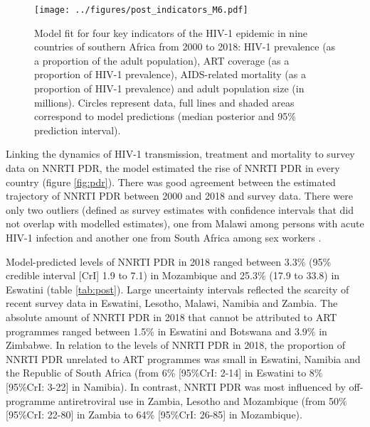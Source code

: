 \documentclass{article}
\begin{document}
\begin{sidewaysfigure}
	\centering
	\texttt{[image: ../figures/post\_indicators\_M6.pdf]}
	\caption{Model fit for four key indicators of the HIV-1 epidemic in nine countries of southern Africa from 2000 to 2018: HIV-1 prevalence (as a proportion of the adult population), ART coverage (as a proportion of HIV-1 prevalence), AIDS-related mortality (as a proportion of HIV-1 prevalence) and adult population size (in millions).  Circles represent data, full lines and shaded areas correspond to model predictions (median posterior and 95\% prediction interval).}
	\label{fig:indic}
\end{sidewaysfigure}

Linking the dynamics of HIV-1 transmission, treatment and mortality to survey data on NNRTI PDR, the model estimated the rise of NNRTI PDR in every country (figure \ref{fig:pdr}). 
There was good agreement between the estimated trajectory of NNRTI PDR between 2000 and 2018 and survey data. 
There were only two outliers (defined as survey estimates with confidence intervals that did not overlap with modelled estimates), one from Malawi among persons with acute HIV-1 infection \cite{rutstein2019high} and another one from South Africa among sex workers \cite{coetzee2017hiv}.

Model-predicted levels of NNRTI PDR in 2018 ranged between 3.3\% (95\% credible interval [CrI] 1.9 to 7.1) in Mozambique and 25.3\% (17.9 to 33.8) in Eswatini (table \ref{tab:post}). Large uncertainty intervals reflected the scarcity of recent survey data in Eswatini, Lesotho, Malawi, Namibia and Zambia. The absolute amount of NNRTI PDR in 2018 that cannot be attributed to ART programmes ranged between 1.5\% in Eswatini and Botswana and 3.9\% in Zimbabwe. In relation to the levels of NNRTI PDR in 2018, the proportion of NNRTI PDR unrelated to ART programmes was small in Eswatini, Namibia and the Republic of South Africa (from 6\% [95\%CrI: 2-14] in Eswatini to 8\% [95\%CrI: 3-22] in Namibia). In contrast, NNRTI PDR was most influenced by off-programme antiretroviral use in Zambia, Lesotho and Mozambique (from 50\% [95\%CrI: 22-80] in Zambia to 64\% [95\%CrI: 26-85] in Mozambique).
\end{document}
